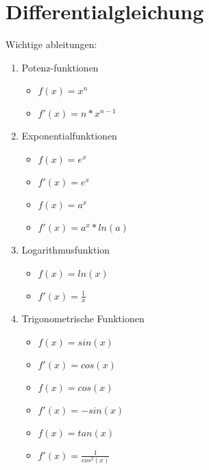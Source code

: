 \newpage
\section{Differentialgleichung}

Wichtige ableitungen:
\begin{enumerate}
    \item Potenz-funktionen \begin{itemize}
              \item $f(x) = x^n$
              \item $f'(x) = n*x^{n-1}$
          \end{itemize}
    \item Exponentialfunktionen \begin{itemize}
              \item $f(x) = e^x$
              \item $f'(x) = e^x$
              \item $f(x) = a^x$
              \item $f'(x) = a^x * ln(a)$
          \end{itemize}
    \item Logarithmusfunktion \begin{itemize}
              \item $f(x) = ln(x)$
              \item $f'(x) = \frac{1}{x}$
          \end{itemize}
    \item Trigonometrische Funktionen \begin{itemize}
              \item $f(x) = sin(x)$
              \item $f'(x) = cos(x)$
              \item $f(x) = cos(x)$
              \item $f'(x) = -sin(x)$
              \item $f(x) = tan(x)$
              \item $f'(x) = \frac{1}{cos^2(x)}$
          \end{itemize}
\end{enumerate}

\newpage

\hfill \break

